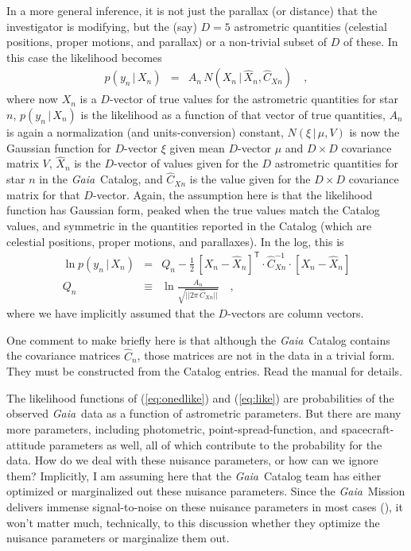 \documentclass[12pt, modern]{aastex62h}
\newcommand{\Gaia}{\textsl{Gaia}}
\newcommand{\given}{\,|\,}
\newcommand{\T}{^{\mathsf{T}}}
\newcommand{\inv}{^{-1}}
\begin{document}
In a more general inference, it is not just the parallax (or distance)
that the investigator is modifying, but the (say) $D=5$ astrometric quantities
(celestial positions, proper motions, and parallax)
or a non-trivial subset of $D$ of these.
In this case the likelihood becomes
\begin{eqnarray}
p(y_n\given X_n) &=& A_n\,N(X_n\given\hat{X}_n,\hat{C}_{Xn})
\label{eq:like}
\quad ,
\end{eqnarray}
where now
$X_n$ is a $D$-vector of true values for the astrometric quantities for star $n$,
$p(y_n\given X_n)$ is the likelihood as a function of that vector of true quantities,
$A_n$ is again a normalization (and units-conversion) constant,
$N(\xi\given\mu,V)$ is now the Gaussian function for $D$-vector $\xi$ given mean $D$-vector $\mu$ and $D\times D$ covariance matrix $V$,
$\hat{X}_n$ is the $D$-vector of values given for the $D$ astrometric quantities for star $n$ in the \Gaia\ Catalog,
and $\hat{C}_{Xn}$ is the value given for the $D\times D$ covariance matrix for that
$D$-vector.
Again, the assumption here is that the likelihood function has Gaussian form, peaked
when the true values match the Catalog values, and symmetric in the quantities
reported in the Catalog (which are celestial positions, proper motions, and parallaxes).
In the log, this is
\begin{eqnarray}
\ln p(y_n\given X_n) &=& Q_n - \frac{1}{2}\,[X_n - \hat{X}_n]\T\cdot\hat{C}_{Xn}\inv\cdot [X_n - \hat{X}_n]
\\
Q_n &\equiv& \ln\frac{A_n}{\sqrt{||2\pi\,\hat{C}_{Xn}||}}
\quad ,
\end{eqnarray}
where we have implicitly assumed that the $D$-vectors are column vectors.

One comment to make briefly here is that although the \Gaia\ Catalog contains
the covariance matrices $\hat{C}_n$, those matrices are not in the data in a
trivial form.
They must be constructed from the Catalog entries.
Read the manual for details.

The likelihood functions of (\ref{eq:onedlike}) and (\ref{eq:like}) are
probabilities of the observed \Gaia\ data as a
function of astrometric parameters.
But there are many more parameters, including photometric, point-spread-function,
and spacecraft-attitude parameters as well, all of which contribute to the probability
for the data.
How do we deal with these nuisance parameters, or how can we ignore them?
Implicitly, I am assuming here that the \Gaia\ Catalog team has either optimized
or marginalized out these nuisance parameters.
Since the \Gaia\ Mission delivers immense signal-to-noise on these nuisance
parameters in most cases (\citealt{holl}), it won't matter much, technically, to this
discussion whether they optimize
the nuisance parameters or marginalize them out.
\end{document}
